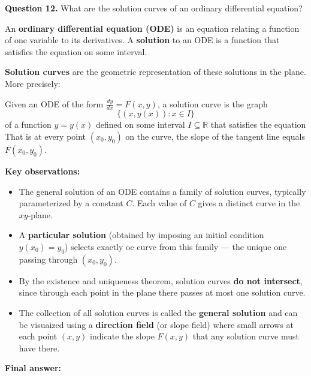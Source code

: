 \textbf{Question 12.} What are the solution curves of an ordinary differential equation?
\begin{respuesta}

An \textbf{ordinary differential equation (ODE)} is an equation relating a function of one variable to its derivatives. A \textbf{solution} to an ODE is a function that satisfies the equation on some interval.

\textbf{Solution curves} are the geometric representation of these solutions in the plane. More precisely:

Given an ODE of the form $\frac{dy}{dx} = F(x, y)$, a solution curve is the graph
$$\{(x, y(x)) : x \in I\}$$
of a function $y = y(x)$ defined on some interval $I \subseteq \mathbb{R}$ that satisfies the equation That is at every point $(x_0, y_0)$ on the curve, the slope of the tangent line equals $F(x_0, y_0)$.

\textbf{Key observations:}
\begin{itemize}
    \item The general solution of an ODE contains a family of solution curves, typically parameterized by a constant $C$. Each value of $C$ gives a distinct curve in the $xy$-plane.
    \item A \textbf{particular solution} (obtained by imposing an initial condition $y(x_0) = y_0$) selects exactly oe curve from this family — the unique one passing through $(x_0, y_0)$.
    \item By the existence and uniqueness theorem, solution curves \textbf{do not intersect}, since through each point in the plane there passes at most one solution curve.
    \item The collection of all solution curves is called the \textbf{general solution} and can be visuaized using a \textbf{direction field} (or slope field) where small arrows at each point $(x,y)$ indicate the slope $F(x,y)$ that any solution curve must have there.
\end{itemize}

    \textbf{Final answer:}
    \begin{center}
    \end{center}
\end{respuesta}







